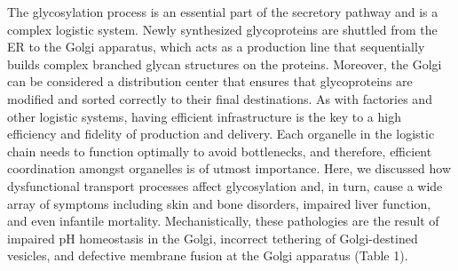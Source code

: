 The glycosylation process is an essential part of the secretory pathway and is a complex logistic system. Newly synthesized glycoproteins are shuttled from the ER to the Golgi apparatus, which acts as a production line that sequentially builds complex branched glycan structures on the proteins. Moreover, the Golgi can be considered a distribution center that ensures that glycoproteins are modified and sorted correctly to their final destinations. As with factories and other logistic systems, having efficient infrastructure is the key to a high efficiency and fidelity of production and delivery. Each organelle in the logistic chain needs to function optimally to avoid bottlenecks, and therefore, efficient coordination amongst organelles is of utmost importance. Here, we discussed how dysfunctional transport processes affect glycosylation and, in turn, cause a wide array of symptoms including skin and bone disorders, impaired liver function, and even infantile mortality. Mechanistically, these pathologies are the result of impaired pH homeostasis in the Golgi, incorrect tethering of Golgi-destined vesicles, and defective membrane fusion at the Golgi apparatus (Table 1).

